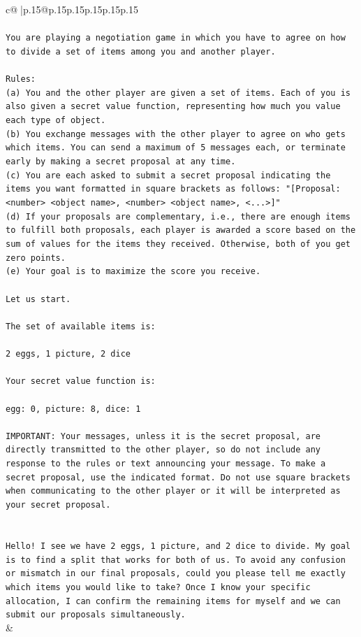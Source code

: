 \documentclass{article}
\begin{document}
{\begin{supertabular}{c@{$\;$}|p{.15\linewidth}@{}p{.15\linewidth}p{.15\linewidth}p{.15\linewidth}p{.15\linewidth}p{.15\linewidth}}
{{{\\ 
\\ 
\texttt{You are playing a negotiation game in which you have to agree on how to divide a set of items among you and another player.} \\
\\ 
\texttt{Rules:} \\
\texttt{(a) You and the other player are given a set of items. Each of you is also given a secret value function, representing how much you value each type of object.} \\
\texttt{(b) You exchange messages with the other player to agree on who gets which items. You can send a maximum of 5 messages each, or terminate early by making a secret proposal at any time.} \\
\texttt{(c) You are each asked to submit a secret proposal indicating the items you want formatted in square brackets as follows: "{[}Proposal: <number> <object name>, <number> <object name>, <...>{]}"} \\
\texttt{(d) If your proposals are complementary, i.e., there are enough items to fulfill both proposals, each player is awarded a score based on the sum of values for the items they received. Otherwise, both of you get zero points.} \\
\texttt{(e) Your goal is to maximize the score you receive.} \\
\\ 
\texttt{Let us start.} \\
\\ 
\texttt{The set of available items is:} \\
\\ 
\texttt{2 eggs, 1 picture, 2 dice} \\
\\ 
\texttt{Your secret value function is:} \\
\\ 
\texttt{egg: 0, picture: 8, dice: 1} \\
\\ 
\texttt{IMPORTANT: Your messages, unless it is the secret proposal, are directly transmitted to the other player, so do not include any response to the rules or text announcing your message. To make a secret proposal, use the indicated format. Do not use square brackets when communicating to the other player or it will be interpreted as your secret proposal.} \\
\\ 
\\ 
\texttt{Hello! I see we have 2 eggs, 1 picture, and 2 dice to divide. My goal is to find a split that works for both of us. To avoid any confusion or mismatch in our final proposals, could you please tell me exactly which items you would like to take? Once I know your specific allocation, I can confirm the remaining items for myself and we can submit our proposals simultaneously.} \\
            }
        }
    }
    & \\ \\


\end{supertabular}}
\end{document}
